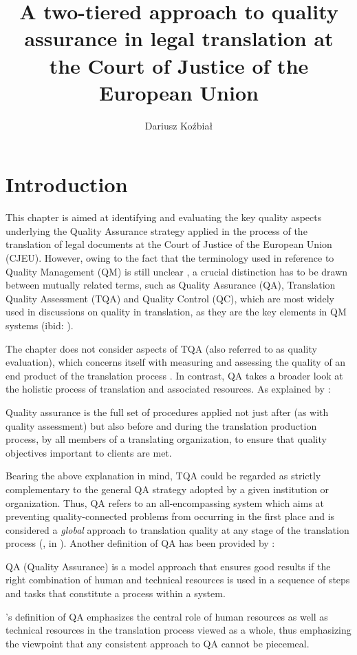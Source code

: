 \documentclass[output=paper]{langsci/langscibook}
\author{Dariusz Koźbiał\affiliation{University of Warsaw}}
\title{A two-tiered approach to quality assurance in legal translation  at the Court of Justice of the European Union}
\begin{document}
\section{Introduction}\label{sec:kozbial:1}

This chapter is aimed at identifying and evaluating the key quality aspects underlying the Quality Assurance strategy applied in the process of the translation of legal documents at the Court of Justice of the European Union (CJEU). However, owing to the fact that the terminology used in reference to Quality Management (QM) is still unclear \citep[168]{Lušicky2017}, a crucial distinction has to be drawn between mutually related terms, such as Quality Assurance (QA), Translation Quality Assessment (TQA) and Quality Control (QC), which are most widely used in discussions on quality in translation, as they are the key elements in QM systems (ibid: \citeyear[169]{Lušicky2017}).

The chapter does not consider aspects of TQA (also referred to as quality evaluation), which concerns itself with measuring and assessing the quality of an end product of the translation process \citep[76]{Drugan2013}. In contrast, QA takes a broader look at the holistic process of translation and associated resources. As explained by \citet[129]{Mossop2014}:

Quality assurance is the full set of procedures applied not just after (as with quality assessment) but also before and during the translation production process, by all members of a translating organization, to ensure that quality objectives important to clients are met.

Bearing the above explanation in mind, TQA could be regarded as strictly complementary to the general QA strategy adopted by a given institution or organization. Thus, QA refers to an all-encompassing system which aims at preventing quality-connected problems from occurring in the first place and is considered a \textit{global} approach to translation quality at any stage of the translation process (\citealt[76]{Drugan2013}, in \citealt[92]{Mossop2001}). Another definition of QA has been provided by \citet[342]{Popiołek2015}:

QA (Quality Assurance) is a model approach that ensures good results if the right combination of human and technical resources is used in a sequence of steps and tasks that constitute a process within a system.

\citeauthor{Popiołek2015}’s definition of QA emphasizes the central role of human resources as well as technical resources in the translation process viewed as a whole, thus emphasizing the viewpoint that any consistent approach to QA cannot be piecemeal.
\end{document}
